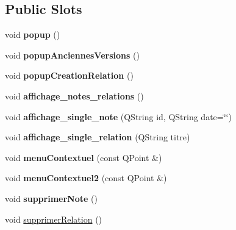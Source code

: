 \subsection*{Public Slots}
\begin{DoxyCompactItemize}
\item 
\mbox{\label{class_fen_principale_a87ca6c2647ca958c60bac70512da5899}} 
void {\bfseries popup} ()
\item 
\mbox{\label{class_fen_principale_a59e1d3d260dd7dc4bec7585695dad965}} 
void {\bfseries popup\+Anciennes\+Versions} ()
\item 
\mbox{\label{class_fen_principale_a04c6b879bd8bc7c7ddf164ce9b4273b1}} 
void {\bfseries popup\+Creation\+Relation} ()
\item 
\mbox{\label{class_fen_principale_a1e99bb2ccb692e8d084b0c667bfd364f}} 
void {\bfseries affichage\+\_\+notes\+\_\+relations} ()
\item 
\mbox{\label{class_fen_principale_a6cc4b79a54ed443cced0fb03f7f83619}} 
void {\bfseries affichage\+\_\+single\+\_\+note} (Q\+String id, Q\+String date=\char`\"{}\char`\"{})
\item 
\mbox{\label{class_fen_principale_a67e142066003277638ed8b7dc67b19e9}} 
void {\bfseries affichage\+\_\+single\+\_\+relation} (Q\+String titre)
\item 
\mbox{\label{class_fen_principale_a55596abf1539b9b6012fc89f0e9c3d6a}} 
void {\bfseries menu\+Contextuel} (const Q\+Point \&)
\item 
\mbox{\label{class_fen_principale_a6518d75ce88927fbd121e465bae896f4}} 
void {\bfseries menu\+Contextuel2} (const Q\+Point \&)
\item 
\mbox{\label{class_fen_principale_abdbd0250f3c3e037bfa7cd27c5162baf}} 
void {\bfseries supprimer\+Note} ()
\item 
void \hyperlink{class_fen_principale_a7dbafe44ea212955ba0b7d674ab5cc9d}{supprimer\+Relation} ()
\item 

\end{DoxyCompactItemize}
